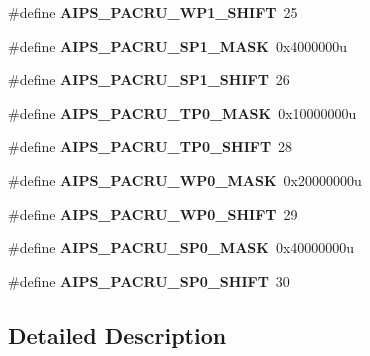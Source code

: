 \begin{DoxyCompactItemize}
\item 
\#define {\bfseries A\+I\+P\+S\+\_\+\+P\+A\+C\+R\+U\+\_\+\+W\+P1\+\_\+\+S\+H\+I\+FT}~25\hypertarget{group__AIPS__Register__Masks_gabb2111d291f1349f14107f21d4bbcafa}{}\label{group__AIPS__Register__Masks_gabb2111d291f1349f14107f21d4bbcafa}

\item 
\#define {\bfseries A\+I\+P\+S\+\_\+\+P\+A\+C\+R\+U\+\_\+\+S\+P1\+\_\+\+M\+A\+SK}~0x4000000u\hypertarget{group__AIPS__Register__Masks_gae9999a5eebb95b0c9975d799c2f81328}{}\label{group__AIPS__Register__Masks_gae9999a5eebb95b0c9975d799c2f81328}

\item 
\#define {\bfseries A\+I\+P\+S\+\_\+\+P\+A\+C\+R\+U\+\_\+\+S\+P1\+\_\+\+S\+H\+I\+FT}~26\hypertarget{group__AIPS__Register__Masks_gadcc067c6bd46dc4d40b8b4332cc9e3da}{}\label{group__AIPS__Register__Masks_gadcc067c6bd46dc4d40b8b4332cc9e3da}

\item 
\#define {\bfseries A\+I\+P\+S\+\_\+\+P\+A\+C\+R\+U\+\_\+\+T\+P0\+\_\+\+M\+A\+SK}~0x10000000u\hypertarget{group__AIPS__Register__Masks_ga0573aaae4d31e91dff47dbff9f8ddfb6}{}\label{group__AIPS__Register__Masks_ga0573aaae4d31e91dff47dbff9f8ddfb6}

\item 
\#define {\bfseries A\+I\+P\+S\+\_\+\+P\+A\+C\+R\+U\+\_\+\+T\+P0\+\_\+\+S\+H\+I\+FT}~28\hypertarget{group__AIPS__Register__Masks_ga6b2e5865ad383db51605af18319df9ee}{}\label{group__AIPS__Register__Masks_ga6b2e5865ad383db51605af18319df9ee}

\item 
\#define {\bfseries A\+I\+P\+S\+\_\+\+P\+A\+C\+R\+U\+\_\+\+W\+P0\+\_\+\+M\+A\+SK}~0x20000000u\hypertarget{group__AIPS__Register__Masks_ga3446c40a6a29e77a1e58737661820c43}{}\label{group__AIPS__Register__Masks_ga3446c40a6a29e77a1e58737661820c43}

\item 
\#define {\bfseries A\+I\+P\+S\+\_\+\+P\+A\+C\+R\+U\+\_\+\+W\+P0\+\_\+\+S\+H\+I\+FT}~29\hypertarget{group__AIPS__Register__Masks_ga0418c29f05f705a85684867c78f72c50}{}\label{group__AIPS__Register__Masks_ga0418c29f05f705a85684867c78f72c50}

\item 
\#define {\bfseries A\+I\+P\+S\+\_\+\+P\+A\+C\+R\+U\+\_\+\+S\+P0\+\_\+\+M\+A\+SK}~0x40000000u\hypertarget{group__AIPS__Register__Masks_gaaf0a5c35e265266dc456996993016f17}{}\label{group__AIPS__Register__Masks_gaaf0a5c35e265266dc456996993016f17}

\item 
\#define {\bfseries A\+I\+P\+S\+\_\+\+P\+A\+C\+R\+U\+\_\+\+S\+P0\+\_\+\+S\+H\+I\+FT}~30\hypertarget{group__AIPS__Register__Masks_ga802a7c9f1c9c004230ad855ec1752866}{}\label{group__AIPS__Register__Masks_ga802a7c9f1c9c004230ad855ec1752866}

\end{DoxyCompactItemize}


\subsection{Detailed Description}
